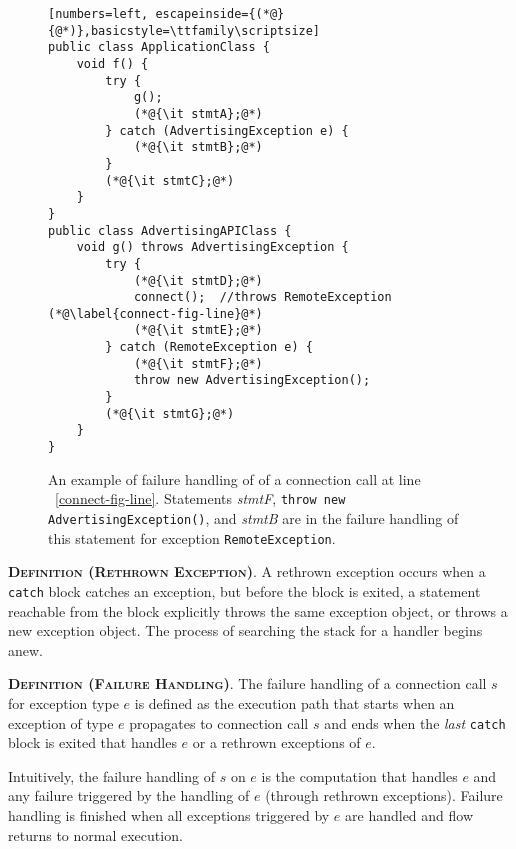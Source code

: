 \begin{figure}
\begin{lstlisting}[numbers=left, escapeinside={(*@}{@*)},basicstyle=\ttfamily\scriptsize]
public class ApplicationClass {
    void f() {
        try {
            g();
            (*@{\it stmtA};@*)
        } catch (AdvertisingException e) {
            (*@{\it stmtB};@*)
        }
        (*@{\it stmtC};@*)
    }
}
public class AdvertisingAPIClass {
    void g() throws AdvertisingException {
        try {
            (*@{\it stmtD};@*)
            connect();  //throws RemoteException (*@\label{connect-fig-line}@*)
            (*@{\it stmtE};@*)
        } catch (RemoteException e) {
            (*@{\it stmtF};@*)
            throw new AdvertisingException();            
        }        
        (*@{\it stmtG};@*)
    }
}
\end{lstlisting}
\caption{\label{fig:failure-handling}An example of failure handling of
  of a connection call at line ~\ref{connect-fig-line}.  Statements
  {\it stmtF}, \lstinline!throw new! \lstinline!AdvertisingException()!, and {\it stmtB}
  are in the failure handling of this statement for exception \lstinline!RemoteException!.
}
\end{figure}

\begin{description}[leftmargin=0cm,listparindent=0pt,itemindent=0cm]
\item \textsc{\bfseries{Definition (Rethrown Exception)}}.  A
rethrown exception occurs when a \lstinline!catch! block catches an
exception, but before the block is exited, a statement reachable from
the block explicitly throws the same exception object, or throws a new
exception object.  The process of searching the stack for a handler
begins anew.

\item \textsc{\bfseries{Definition (Failure Handling)}}. The failure
  handling of a connection call $s$ for exception type $e$ is defined
  as the execution path that starts when an exception of type $e$
  propagates to connection call $s$ and ends when the {\it last}
  \lstinline!catch! block is exited that handles $e$ or a rethrown
  exceptions of $e$.
\end{description}

Intuitively, the failure handling of $s$ on $e$ is the computation
that handles $e$ and any failure triggered by the handling of $e$
(through rethrown exceptions).  Failure handling is finished when all
exceptions triggered by $e$ are handled and flow returns to normal
execution.  

